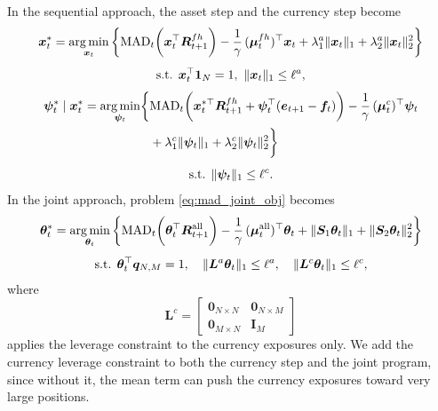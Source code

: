 In the sequential approach, the asset step and the currency step become
\begin{equation}
\begin{gathered}
    \bm{x}_t^* = \operatorname*{arg\,min}_{\bm{x}_t} \left\{ \text{MAD}_t\biggl( \bm{x}_t^\top \bm{R}^{fh}_{t+1} \biggr)
    - \frac{1}{\gamma}\, (\bm{\mu}^{fh}_t)^\top \bm{x}_t
    + \lambda_1^a \|\bm{x}_t\|_1 + \lambda_2^a \|\bm{x}_t\|_2^2 \right\} \\[4pt]
    \text{s.t. } \bm{x}_t^\top \bm{1}_N = 1,\ \|\bm{x}_t\|_1 \le \ell^a,
\end{gathered}
\end{equation}
\begin{equation}
\begin{gathered}
    \begin{aligned}
    \bm{\psi}_t^* \mid \bm{x}_t^* = \operatorname*{arg\,min}_{\bm{\psi}_t} \biggl\{ &
    \text{MAD}_t\biggl( \bm{x}_t^{*\top} \bm{R}^{fh}_{t+1} + \bm{\psi}_t^\top (\bm{e}_{t+1} - \bm{f}_t) \biggr)
    - \frac{1}{\gamma}\, (\bm{\mu}^c_t)^\top \bm{\psi}_t \\
    & + \lambda_1^c \|\bm{\psi}_t\|_1 + \lambda_2^c \|\bm{\psi}_t\|_2^2 \biggr\}
    \end{aligned} \\[4pt]
    \text{s.t. } \|\bm{\psi}_t\|_1 \le \ell^c.
\end{gathered}
\end{equation}
In the joint approach, problem \eqref{eq:mad_joint_obj} becomes
\begin{equation}
\begin{gathered}
    \bm{\theta}_t^* = \operatorname*{arg\,min}_{\bm{\theta}_t} \left\{ \text{MAD}_t\biggl( \bm{\theta}_t^\top \bm{R}^{\text{all}}_{t+1} \biggr)
    - \frac{1}{\gamma}\, (\bm{\mu}^{\text{all}}_t)^\top \bm{\theta}_t
    + \|\bm{S}_1 \bm{\theta}_t\|_1 + \|\bm{S}_2 \bm{\theta}_t\|_2^2 \right\} \\[4pt]
    \text{s.t. } \bm{\theta}_t^\top \bm{q}_{N,M} = 1, \quad \|\bm{L}^a \bm{\theta}_t\|_1 \le \ell^a, \quad
    \|\bm{L}^c \bm{\theta}_t\|_1 \le \ell^c,
\end{gathered}
\end{equation}
where
\begin{equation*}
    \bm{L}^c = \begin{bmatrix} \bm{0}_{N \times N} & \bm{0}_{N \times M} \\ \bm{0}_{M \times N} & \bm{I}_M \end{bmatrix}
\end{equation*}
applies the leverage constraint to the currency exposures only. We add the currency leverage constraint to both the
currency step and the joint program, since without it, the mean term can push the currency exposures toward very large
positions.



